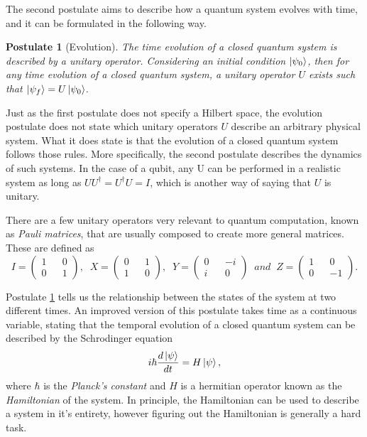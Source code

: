 \documentclass[../../../dissertation.tex]{subfiles}
\newtheorem{post}{Postulate}
\begin{document}
The second postulate aims to describe how a quantum system evolves with time,
and it can be formulated in the following way. 
\begin{post}[Evolution]
	\label{post:evolution}
	The time evolution of a closed quantum system is described by a unitary
	operator. Considering an initial condition $\ket{\psi_0}$, then for any
	time evolution of a closed quantum system, a unitary operator $U$ exists
	such that $\ket{\psi_f}=U\ket{\psi_0}$.\par
\end{post}
Just as the first postulate does not specify a Hilbert space, the evolution
postulate does not state which unitary operators $U$ describe an arbitrary
physical system. What it does state is that the evolution of a closed quantum
system follows those rules. More specifically, the second postulate describes
the dynamics of such systems. In the case of a qubit, any U can be performed in
a realistic system as long as $U U^\dag = U^\dag U = I$, which is another way
of saying that $U$ is unitary.\par  
There are a few unitary operators very relevant to quantum computation, known
as \textit{Pauli matrices}, that are usually composed to create more general
matrices. These are defined as
\begin{equation}
	I = \begin{pmatrix} 
		1 && 0\\
		0 && 1
	    \end{pmatrix}, \; \;
	X = \begin{pmatrix} 
		0 && 1\\
		1 && 0
	    \end{pmatrix}, \; \;
	Y = \begin{pmatrix} 
		0 && -i\\
		i && 0
	    \end{pmatrix} \;\; and \; \;
	Z = \begin{pmatrix} 
		1 && 0\\
		0 && -1
	    \end{pmatrix}.
\end{equation}\par
Postulate \ref{post:evolution} tells us the relationship between the states of
the system at two different times. An improved version of this postulate takes
time as a continuous variable, stating that the temporal evolution of a closed
quantum system can be described by the Schrodinger equation 
\begin{equation}
	i \hbar \frac{d\ket{\psi}}{dt} = H \ket{\psi},
\end{equation}
where $\hbar$ is the \textit{Planck's constant} and $H$ is a hermitian operator
known as the \textit{Hamiltonian} of the system. In principle, the Hamiltonian
can be used to describe a system in it's entirety, however figuring out the
Hamiltonian is generally a hard task.\par
\end{document}
